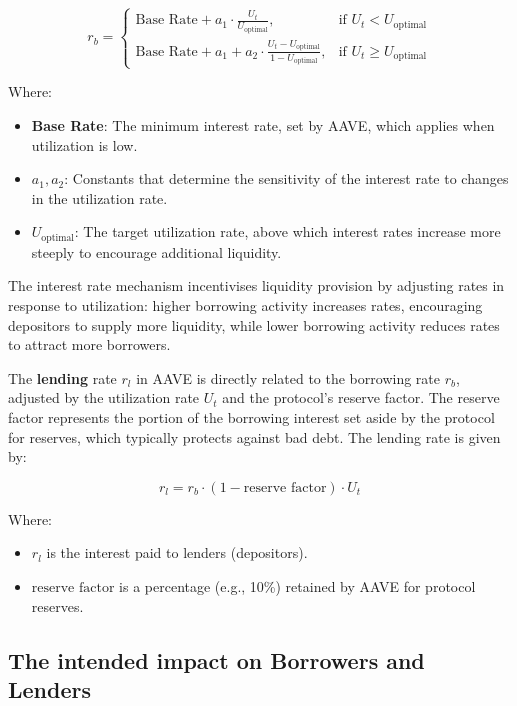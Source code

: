 \documentclass{article} %
\theoremstyle{plain}
\theoremstyle{definition} %
\begin{document}
\[
r_b = 
\begin{cases} 
\text{Base Rate} + a_1 \cdot \frac{U_t}{U_{\text{optimal}}}, & \text{if } U_t < U_{\text{optimal}} \\
\text{Base Rate} + a_1 + a_2 \cdot \frac{U_t - U_{\text{optimal}}}{1 - U_{\text{optimal}}}, & \text{if } U_t \geq U_{\text{optimal}}
\end{cases}
\]

Where:
\begin{itemize}
    \item \textbf{Base Rate}: The minimum interest rate, set by AAVE, which applies when utilization is low.
    \item \( a_1, a_2 \): Constants that determine the sensitivity of the interest rate to changes in the utilization rate.
    \item \( U_{\text{optimal}} \): The target utilization rate, above which interest rates increase more steeply to encourage additional liquidity.
\end{itemize}

The interest rate mechanism incentivises liquidity provision by adjusting rates in response to utilization: higher borrowing activity increases rates,
 encouraging depositors to supply more liquidity, while lower borrowing activity reduces rates to attract more borrowers.

 The \textbf{lending} rate \(r_l\) in AAVE is directly related to the borrowing rate \(r_b\), adjusted by the utilization rate \(U_t\) and the protocol’s reserve factor. The reserve factor represents the portion of the borrowing interest set aside by the protocol for reserves, which typically protects against bad debt. The lending rate is given by:

\[
r_l = r_b \cdot (1 - \text{reserve factor}) \cdot U_t
\]

Where:
\begin{itemize}
    \item \( r_l \) is the interest paid to lenders (depositors).
    \item \( \text{reserve factor} \) is a percentage (e.g., 10\%) retained by AAVE for protocol reserves.
\end{itemize}

\subsection{The intended impact on Borrowers and Lenders}
\end{document}
